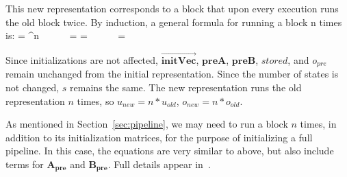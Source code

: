     This new representation corresponds to a block that upon
every execution runs the old block twice. By induction, a general
formula for running a block n times is:
\starteqnstar
{} = ^n ~~~~~
 = 
\doneeqnstar
\starteqnstar
{} =  ~~~~~
 = 
\doneeqnstar

    Since initializations are not affected, $\overrightarrow{\mathbf{initVec}}$,
$\mathbf{preA}$, $\mathbf{preB}$, $stored$, and $o_{pre}$ remain
unchanged from the initial representation. Since the number of
states is not changed, $s$ remains the same. The new
representation runs the old representation $n$ times, so $u_{new}
= n * u_{old}$, $o_{new} = n * o_{old}$.

    As mentioned in Section~\ref{sec:pipeline}, we may need to
run a block $n$ times, in addition to its initialization matrices, for
the purpose of initializing a full pipeline.  In this case, the
equations are very similar to above, but also include terms for
$\mathbf{A_{pre}}$ and $\mathbf{B_{pre}}$.  Full details appear
in~\cite{Agrawal04}.

